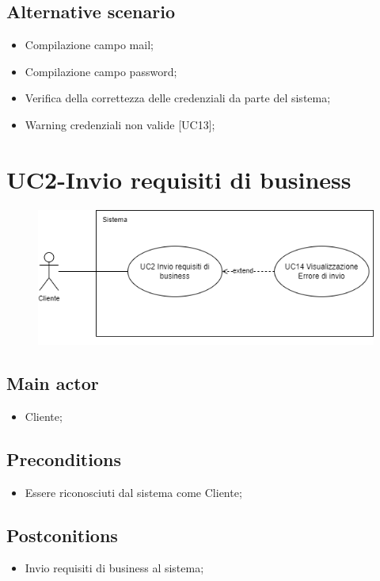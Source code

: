 \documentclass{article}
\begin{document}
        \subsection*{Alternative scenario}
            \begin{itemize}
                \item Compilazione campo mail;
                \item Compilazione campo password;
                \item Verifica della correttezza delle credenziali da parte del sistema;
                \item Warning credenziali non valide [UC13];
            \end{itemize}
    
\section{UC2-Invio requisiti di business}
    \begin{figure}[h]
      \centering
      \includegraphics{./imgUML/UC2.png}
      \label{fig:immagine}
    \end{figure}
     \subsection*{Main actor}
     \begin{itemize}
         \item Cliente;
     \end{itemize}
     \subsection*{Preconditions} 
     \begin{itemize}
         \item Essere riconosciuti dal sistema come Cliente;
     \end{itemize}
     \subsection*{Postconitions} 
        \begin{itemize}
            \item Invio requisiti di business al sistema;
        \end{itemize}
\end{document}
